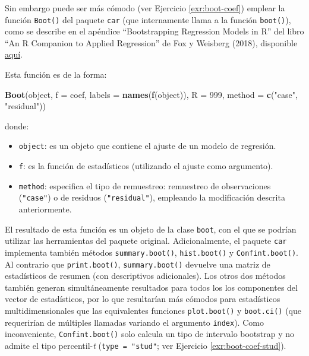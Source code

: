 \documentclass[
  spanish,
  10pt,
]{book}
\newenvironment{Shaded}{\begin{snugshade}}{\end{snugshade}}
\newcommand{\AttributeTok}[1]{\textcolor[rgb]{0.13,0.29,0.53}{#1}}
\newcommand{\DecValTok}[1]{\textcolor[rgb]{0.00,0.00,0.81}{#1}}
\newcommand{\FunctionTok}[1]{\textcolor[rgb]{0.13,0.29,0.53}{\textbf{#1}}}
\newcommand{\NormalTok}[1]{#1}
\newcommand{\StringTok}[1]{\textcolor[rgb]{0.31,0.60,0.02}{#1}}
\theoremstyle{break}
\theoremstyle{nonumberplain}
\begin{document}
Sin embargo puede ser más cómodo (ver Ejercicio \ref{exr:boot-coef}) emplear la función \texttt{Boot()} del paquete \texttt{car} (que internamente llama a la función \texttt{boot()}),
como se describe en el apéndice ``Bootstrapping Regression Models in R'' del libro ``An R Companion to Applied Regression'' de Fox y Weisberg (2018), disponible \href{https://www.john-fox.ca/Companion/appendices.html}{aquí}.

Esta función es de la forma:

\begin{Shaded}
\begin{Highlighting}[]
\FunctionTok{Boot}\NormalTok{(object, }\AttributeTok{f =}\NormalTok{ coef, }\AttributeTok{labels =} \FunctionTok{names}\NormalTok{(}\FunctionTok{f}\NormalTok{(object)), }\AttributeTok{R =} \DecValTok{999}\NormalTok{, }
     \AttributeTok{method =} \FunctionTok{c}\NormalTok{(}\StringTok{"case"}\NormalTok{, }\StringTok{"residual"}\NormalTok{))}
\end{Highlighting}
\end{Shaded}

donde:

\begin{itemize}
\item
  \texttt{object}: es un objeto que contiene el ajuste de un modelo de regresión.
\item
  \texttt{f}: es la función de estadísticos (utilizando el ajuste como argumento).
\item
  \texttt{method}: especifica el tipo de remuestreo: remuestreo de observaciones (\texttt{"case"})
  o de residuos (\texttt{"residual"}), empleando la modificación descrita anteriormente.
\end{itemize}

El resultado de esta función es un objeto de la clase \texttt{boot}, con el que se podrían utilizar las herramientas del paquete original.
Adicionalmente, el paquete \texttt{car} implementa también métodos \texttt{summary.boot()}, \texttt{hist.boot()} y \texttt{Confint.boot()}.
Al contrario que \texttt{print.boot()}, \texttt{summary.boot()} devuelve una matriz de estadísticos de resumen (con descriptivos adicionales).
Los otros dos métodos también generan simultáneamente resultados para todos los los componentes del vector de estadísticos, por lo que resultarían más cómodos para estadísticos multidimensionales que las equivalentes funciones \texttt{plot.boot()} y \texttt{boot.ci()} (que requerirían de múltiples llamadas variando el argumento \texttt{index}).
Como inconveniente, \texttt{Confint.boot()} solo calcula un tipo de intervalo bootstrap y no admite el tipo percentil-\emph{t} (\texttt{type\ =\ "stud"}; ver Ejercicio \ref{exr:boot-coef-stud}).
\end{document}
